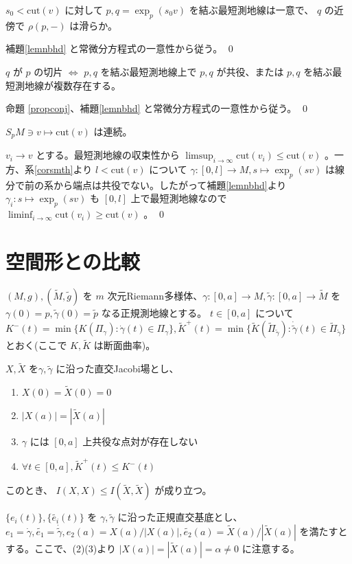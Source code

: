 \documentclass[dvipdfmx,a4paper]{jsreport}
\theoremstyle{definition}
\renewcommand{\tilde}{\widetilde}
\begin{document}
\cor\label{corsmth} $s_0<\mbox{cut}(v)$ に対して $p,q=\exp_p(s_0v)$ を結ぶ最短測地線は一意で、 $q$ の近傍で $\rho(p,-)$ は滑らか。

\prf 補題\ref{lemnbhd} と常微分方程式の一意性から従う。 \qed

\cor\label{corcut} $q$ が $p$ の切片 $\iff$ $p,q$ を結ぶ最短測地線上で $p,q$ が共役、または $p,q$ を結ぶ最短測地線が複数存在する。

\prf 命題 \ref{propconj}、補題\ref{lemnbhd} と常微分方程式の一意性から従う。 \qed

\lem $S_pM \ni v \mapsto \mbox{cut}(v)$ は連続。

\prf $v_i \to v$ とする。最短測地線の収束性から $\limsup_{i \to \infty} \mbox{cut}(v_i) \leq \mbox{cut}(v)$ 。一方、系\ref{corsmth}より $l<\mbox{cut}(v)$ について $\gamma:[0,l] \to M,s \mapsto \exp_p(sv)$ は線分で前の系から端点は共役でない。したがって補題\ref{lemnbhd}より $\gamma_i:s \mapsto \exp_p(sv)$ も $[0,l]$ 上で最短測地線なので $\liminf_{i \to \infty} \mbox{cut}(v_i) \geq \mbox{cut}(v)$ 。 \qed

\section{空間形との比較}

$(M,g),(\tilde{M},\tilde{g})$ を $m$ 次元Riemann多様体、$\gamma:[0,a] \to M,\tilde{\gamma}:[0,a] \to \tilde{M}$ を $\gamma(0)=p,\tilde{\gamma}(0)=\tilde{p}$ なる正規測地線とする。 $t \in [0,a]$ について $K^-(t)=\min\{K(\Pi_{\gamma}) \colon \dot{\gamma}(t) \in \Pi_{\gamma}\},\tilde{K}^+(t)=\min\{\tilde{K}(\tilde{\Pi}_{\tilde{\gamma}}) \colon \dot{\tilde{\gamma}}(t) \in \tilde{\Pi}_{\tilde{\gamma}}\}$ とおく(ここで $K,\tilde{K}$ は断面曲率)。

\lem $X,\tilde{X}$ を$\gamma,\tilde{\gamma}$ に沿った直交Jacobi場とし、
\begin{enumerate}
    \item $X(0)=\tilde{X}(0)=0$ 
    \item $|X(a)|=|\tilde{X}(a)|$
    \item $\gamma$ には $[0,a]$ 上共役な点対が存在しない
    \item $\forall t \in [0,a],\tilde{K}^+(t) \leq K^-(t)$ 
\end{enumerate}

このとき、 $I(X,X)\leq I(\tilde{X},\tilde{X})$ が成り立つ。

\prf $\{e_i(t)\},\{\tilde{e_i}(t)\}$ を $\gamma,\tilde{\gamma}$ に沿った正規直交基底とし、$e_1=\dot{\gamma},\tilde{e_1}=\dot{\tilde{\gamma}},e_2(a)=X(a)/|X(a)|,\tilde{e_2}(a)=\tilde{X}(a)/|\tilde{X}(a)|$ を満たすとする。ここで、(2)(3)より $|X(a)|=|\tilde{X}(a)|=\alpha \neq 0$ に注意する。
\end{document}
